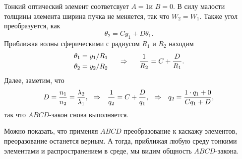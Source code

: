 Тонкий оптический элемент соответсвует $A=1$и $B = 0$. В силу малости толщины элемента ширина пучка не меняется, так что $W_2 = W_1$. Также угол преобразуется, как
\begin{equation*}
    \theta_2 = C y_1 + D \theta_1.
\end{equation*}
Приближая волны сферическими с радиусом $R_1$ и $R_2$ находим
\begin{equation*}
    \left.\begin{aligned}
        \theta_1 = y_1 / R_1 \\
        \theta_2 = y_2 / R_2 \\
    \end{aligned}\right.
    \hspace{0.5cm} \Rightarrow \hspace{0.5cm}
    \frac{1}{R_2} = C + \frac{D}{R_1}.
\end{equation*}
Далее, заметим, что
\begin{equation*}
    D = \frac{n_1}{n_2} = \frac{\lambda_2}{\lambda_1},
    \hspace{0.25cm} \Rightarrow \hspace{0.25cm}
    \frac{1}{q_2} = C + \frac{D}{q_1},
    \hspace{0.25cm} \Rightarrow \hspace{0.25cm}
    q_2 = \frac{1 \cdot q_1 + 0}{C q_1 + D},
\end{equation*}
так что $ABCD$-закон снова выполняется. 


Можно показать, что применяя $ABCD$ преобразование к каскажу элементов, преоразование останется верным. А тогда, приближая любую среду тонкими элементами и распространением в среде, мы видим общность $ABCD$-закона.




